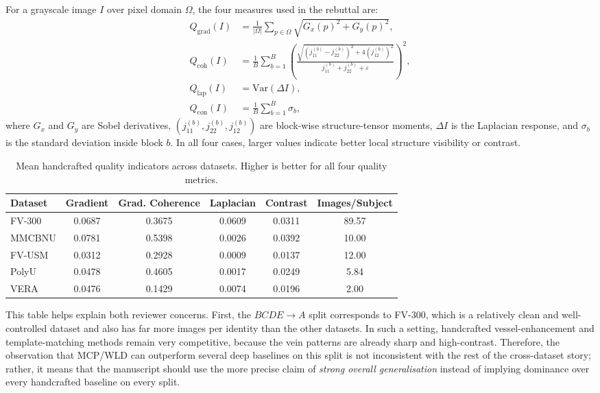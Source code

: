 \documentclass[11pt]{article}
\begin{document}
For a grayscale image $I$ over pixel domain $\Omega$, the four measures used in the rebuttal are:
\begin{align}
Q_{\text{grad}}(I) &= \frac{1}{|\Omega|}\sum_{p \in \Omega} \sqrt{G_x(p)^2 + G_y(p)^2}, \\
Q_{\text{coh}}(I) &= \frac{1}{B}\sum_{b=1}^{B}
\left(
\frac{\sqrt{(j_{11}^{(b)}-j_{22}^{(b)})^2 + 4(j_{12}^{(b)})^2}}
{j_{11}^{(b)} + j_{22}^{(b)} + \varepsilon}
\right)^2, \\
Q_{\text{lap}}(I) &= \mathrm{Var}(\Delta I), \\
Q_{\text{con}}(I) &= \frac{1}{B}\sum_{b=1}^{B} \sigma_b,
\end{align}
where $G_x$ and $G_y$ are Sobel derivatives, $(j_{11}^{(b)},j_{22}^{(b)},j_{12}^{(b)})$ are block-wise structure-tensor moments, $\Delta I$ is the Laplacian response, and $\sigma_b$ is the standard deviation inside block $b$. In all four cases, larger values indicate better local structure visibility or contrast.

\begin{table}[ht!]
    \centering
    \begin{tabular}{|l|c|c|c|c|c|}
        \hline
        Dataset & Gradient & Grad. Coherence & Laplacian & Contrast & Images/Subject \\
        \hline
        FV-300 & 0.0687 & 0.3675 & 0.0609 & 0.0311 & 89.57 \\
        MMCBNU & 0.0781 & 0.5398 & 0.0026 & 0.0392 & 10.00 \\
        FV-USM & 0.0312 & 0.2928 & 0.0009 & 0.0137 & 12.00 \\
        PolyU & 0.0478 & 0.4605 & 0.0017 & 0.0249 & 5.84 \\
        VERA & 0.0476 & 0.1429 & 0.0074 & 0.0196 & 2.00 \\
        \hline
    \end{tabular}
    \caption{Mean handcrafted quality indicators across datasets. Higher is better for all four quality metrics.}
    \label{tab:rebuttal_quality}
\end{table}

This table helps explain both reviewer concerns. First, the $BCDE \rightarrow A$ split corresponds to FV-300, which is a relatively clean and well-controlled dataset and also has far more images per identity than the other datasets. In such a setting, handcrafted vessel-enhancement and template-matching methods remain very competitive, because the vein patterns are already sharp and high-contrast. Therefore, the observation that MCP/WLD can outperform several deep baselines on this split is not inconsistent with the rest of the cross-dataset story; rather, it means that the manuscript should use the more precise claim of \emph{strong overall generalisation} instead of implying dominance over every handcrafted baseline on every split.
\end{document}
